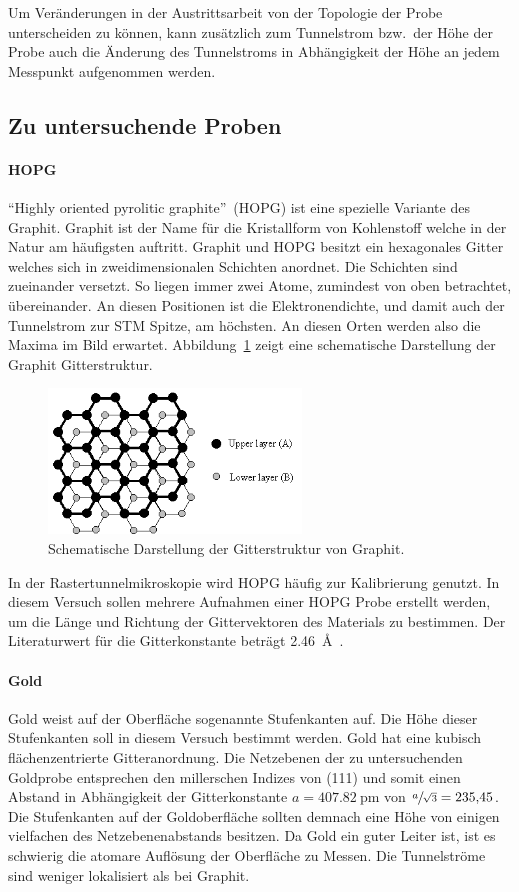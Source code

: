 Um Veränderungen in der Austrittsarbeit von der Topologie der Probe unterscheiden zu können,
kann zusätzlich zum Tunnelstrom bzw.\ der Höhe der Probe auch die Änderung des Tunnelstroms in Abhängigkeit der Höhe an jedem Messpunkt aufgenommen werden.

\subsection{Zu untersuchende Proben}

\paragraph{HOPG}
\enquote{Highly oriented pyrolitic graphite}~(HOPG) ist eine spezielle Variante des Graphit.
Graphit ist der Name für die Kristallform von Kohlenstoff welche in der Natur am häufigsten auftritt. Graphit und HOPG besitzt ein hexagonales Gitter  welches sich in zweidimensionalen
Schichten anordnet. Die Schichten sind zueinander versetzt. So liegen immer zwei Atome, zumindest von oben betrachtet,  übereinander. An diesen
Positionen ist die Elektronendichte, und damit auch der Tunnelstrom zur STM Spitze, am höchsten. An diesen Orten werden also die Maxima im Bild erwartet.
Abbildung~\ref{fig:hopg_structure} zeigt eine schematische Darstellung der Graphit Gitterstruktur.
\begin{figure}
  \centering
  \includegraphics[width=0.6\textwidth]{images/hopg_structure.png}
  \caption{Schematische Darstellung der Gitterstruktur von Graphit.\cite{hopg_structure}}
  \label{fig:hopg_structure}
\end{figure}
In der Rastertunnelmikroskopie wird HOPG häufig zur Kalibrierung genutzt.
In diesem Versuch sollen mehrere Aufnahmen einer HOPG Probe erstellt werden,
um die Länge und Richtung der Gittervektoren des Materials zu bestimmen.
Der Literaturwert für die Gitterkonstante beträgt \SI{2.46}{\angstrom}~\cite{stm1}.

\paragraph{Gold}
Gold weist auf der Oberfläche sogenannte Stufenkanten auf. Die Höhe dieser Stufenkanten soll in diesem Versuch bestimmt werden.
Gold hat eine kubisch flächenzentrierte Gitteranordnung. Die Netzebenen der zu untersuchenden Goldprobe entsprechen den millerschen Indizes von (111)
und somit einen Abstand in Abhängigkeit der Gitterkonstante $a=\SI{407.82}{\pico\meter}$ von $\sfrac{a}{\sqrt{3}} = \num{235.45}$\cite{stm_gold}.
Die Stufenkanten auf der Goldoberfläche sollten demnach eine Höhe von einigen vielfachen des Netzebenenabstands besitzen.
Da Gold ein guter Leiter ist, ist es schwierig die atomare Auflösung der Oberfläche zu Messen. Die Tunnelströme sind weniger lokalisiert
als bei Graphit.
